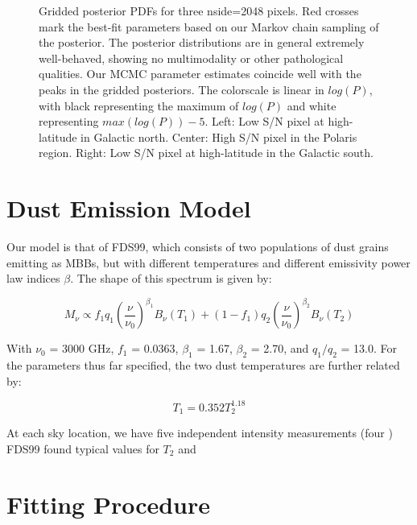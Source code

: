 \documentclass{emulateapj}
\begin{document}
\begin{figure*}
\begin{center}
\caption{Gridded posterior PDFs for three nside=2048 pixels. Red crosses mark 
the best-fit parameters based on our Markov chain sampling of the posterior. 
The posterior distributions are in general extremely well-behaved, showing
no multimodality or other pathological qualities. Our MCMC parameter 
estimates coincide well with the peaks in the gridded posteriors. The 
colorscale is linear in $log(P)$, with black representing the maximum of 
$log(P)$ and white representing $max(log(P))-5$. Left: Low S/N pixel at 
high-latitude in Galactic north. Center: High S/N pixel in the Polaris region. 
Right: Low S/N pixel at high-latitude in the Galactic south.}
\end{center}
\end{figure*}

\section{Dust Emission Model}
\label{sec:modeling}

Our model is that of FDS99, which consists of two populations of dust 
grains emitting as MBBs, but with different temperatures and different 
emissivity power law indices $\beta$. The shape of this spectrum is given by:

\begin{equation}
M_{\nu} \propto f_{1}q_{1}(\frac{\nu}{\nu_{0}})^{\beta_1}B_{\nu}(T_1) + (1-f_{1})q_{2}(\frac{\nu}{\nu_0})^{\beta_2}B_{\nu}(T_2)
\end{equation}

With $\nu_0$ = 3000 GHz, $f_{1}$ = 0.0363, $\beta_1$ = 1.67, $\beta_2$ = 2.70, 
and $q_1/q_2$ = 13.0. For the parameters thus far specified, the two dust 
temperatures are further related by:

\begin{equation}
T_1 = 0.352T_2^{1.18}
\end{equation}

At each sky location, we have five independent intensity measurements (four ) 
FDS99 found typical values for $T_2$ and 

\section{Fitting Procedure}
\label{sec:fitting}
\end{document}

